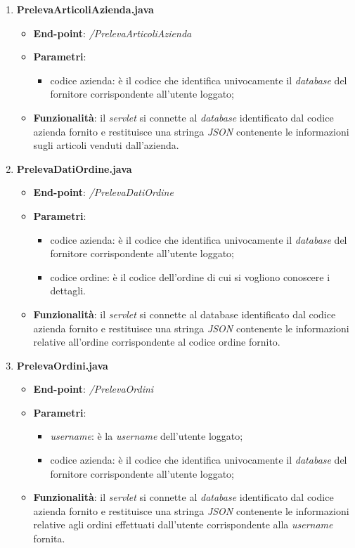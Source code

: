 \documentclass[12pt, a4paper, titlepage]{report}
\begin{document}
\begin{enumerate}
		\item \textbf{PrelevaArticoliAzienda.java}
		\begin{itemize}
			\item \textbf{End-point}: \textit{/PrelevaArticoliAzienda}
			\item \textbf{Parametri}:
			\begin{itemize}
				\item codice azienda: è il codice che identifica univocamente il \textit{database} del fornitore corrispondente all'utente loggato;
			\end{itemize}
			\item \textbf{Funzionalità}: il \textit{servlet} si connette al \textit{database} identificato dal codice azienda fornito e restituisce una stringa \textit{JSON} contenente le informazioni sugli articoli venduti dall'azienda.
		\end{itemize}
	
		\item \textbf{PrelevaDatiOrdine.java}
		\begin{itemize}
			\item \textbf{End-point}: \textit{/PrelevaDatiOrdine}
			\item \textbf{Parametri}:
			\begin{itemize}
				\item codice azienda: è il codice che identifica univocamente il \textit{database} del fornitore corrispondente all'utente loggato;
				\item codice ordine: è il codice dell'ordine di cui si vogliono conoscere i dettagli.
			\end{itemize}
			\item \textbf{Funzionalità}: il \textit{servlet} si connette al database identificato dal codice azienda fornito e restituisce una stringa \textit{JSON} contenente le informazioni relative all'ordine corrispondente al codice ordine fornito.
		\end{itemize}
	
		\item \textbf{PrelevaOrdini.java}
		\begin{itemize}
			\item \textbf{End-point}: \textit{/PrelevaOrdini}
			\item \textbf{Parametri}:
			\begin{itemize}
				\item \textit{username}: è la \textit{username} dell'utente loggato;
				\item codice azienda: è il codice che identifica univocamente il \textit{database} del fornitore corrispondente all'utente loggato;
			\end{itemize}
			\item \textbf{Funzionalità}: il \textit{servlet} si connette al \textit{database} identificato dal codice azienda fornito e restituisce una stringa \textit{JSON} contenente le informazioni relative agli ordini effettuati dall'utente corrispondente alla \textit{username} fornita.
		\end{itemize}
	

\end{enumerate}
\end{document}
